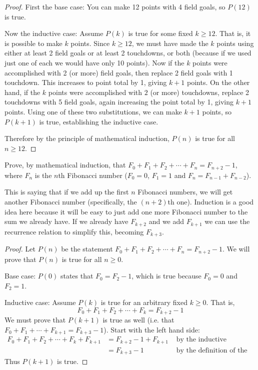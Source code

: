 \documentclass[11pt]{exam}
\begin{document}
\begin{questions}
\begin{solution}
\begin{proof}
    First the base case: You can make 12 points with 4 field goals, so $P(12)$ is true.
    
    Now the inductive case: Assume $P(k)$ is true for some fixed $k \ge 12$.  That is, it is possible to make $k$ points.  Since $k \ge 12$, we must have made the $k$ points using either at least 2 field goals or at least 2 touchdowns, or both (because if we used just one of each we would have only 10 points).  Now if the $k$ points were accomplished with 2 (or more) field goals, then replace 2 field goals with 1 touchdown.  This increases to point total by 1, giving $k + 1$ points.  On the other hand, if the $k$ points were accomplished with $2$ (or more) touchdowns, replace 2 touchdowns with 5 field goals, again increasing the point total by 1, giving $k+1$ points.  Using one of these two substitutions, we can make $k+1$ points, so $P(k+1)$ is true, establishing the inductive case.
    
    Therefore by the principle of mathematical induction, $P(n)$ is true for all $n \ge 12$.
  \end{proof}
\end{solution}



\question[6] Prove, by mathematical induction, that $F_0 + F_1 + F_2 + \cdots + F_{n} = F_{n+2} - 1$, where $F_n$ is the $n$th Fibonacci number ($F_0 = 0$, $F_1 = 1$ and $F_n = F_{n-1} + F_{n-2}$).
\begin{solution}
 This is saying that if we add up the first $n$ Fibonacci numbers, we will get another Fibonacci number (specifically, the $(n+2)$th one).  Induction is a good idea here because it will be easy to just add one more Fibonacci number to the sum we already have.  If we already have $F_{k+2}$ and we add $F_{k+1}$ we can use the recurrence relation to simplify this, becoming $F_{k+3}$.  
 
  \begin{proof}
    Let $P(n)$ be the statement $F_0 + F_1 + F_2 + \cdots + F_n = F_{n+2} - 1$.  We will prove that $P(n)$ is true for all $n \ge 0$.  
    
    Base case: $P(0)$ states that $F_0 = F_2 - 1$, which is true because $F_0 = 0$ and $F_2 = 1$.
    
    Inductive case:  Assume $P(k)$ is true for an arbitrary fixed $k \ge 0$.  That is, \[F_0 + F_1 + F_2 + \cdots + F_k = F_{k+2} - 1\]
    We must prove that $P(k+1)$ is true as well (i.e. that $F_0 + F_1 + \cdots +F_{k+1} = F_{k+3} - 1$).  Start with the left hand side:
    \begin{align*}
      F_0 + F_1 + F_2 + \cdots + F_k + F_{k+1} & = F_{k+2} - 1 + F_{k+1} & \mbox{ by the inductive hypothesis}\\
      & = F_{k+3} - 1 & \mbox{ by the definition of the Fibonacci numbers}
    \end{align*}
    Thus $P(k+1)$ is true.
    

\end{proof}
\end{solution}
\end{questions}
\end{document}
